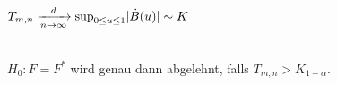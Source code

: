 \documentclass{cheat-sheet}
\newcommand{\E}{\mathbb{E}} %
\newcommand{\ind}{\mathbbm{1}} %
\DeclareMathOperator{\var}{Var} %
\newcommand{\Normal}{\mathcal{N}} %
\begin{document}
\iffalse
\begin{bem}
  Asymptotik von $T_{n,m}$ für $m, n \to \infty$
  \[
    X_{m,n}(u) \coloneqq \sqrt{\tfrac{m \cdot n}{m + n}} \left( \hat{G}_n(u) - \hat{G}^*_m(u) \right), \quad
    0 \leq u \leq 1.
  \]
  \[
    \E X_{m,n} = \sqrt{\tfrac{m \cdot n}{m + n}} \left( \E \ind_{\cinterval{0}{u}}(U_1) - \E \ind_{\cinterval{0}{u}}(U^*_1) \right) = 0
  \]
  \[
    \var(X_{m,n}) = \tfrac{m \cdot n}{m + n} \left( \E (\hat{G}_n(u))^2 + \E (\hat{G}_m(u))^2 - 2 \E \hat{G}^*_n(u) \cdot \E \hat{G}^*_m(u) \right)
  \]

  Genauso wie oben ergibt sich
  \[
    (X_{m,n}(u_1), \ldots, X_{m,n}(u_k)) \xra[n \to \infty]{d} \Normal_k(0, \Sigma)
    \quad \text{mit} \quad
    \Sigma_{ij} = u_i \wedge u_j - u_i \cdot u_j.
  \]

  Daraus folgt die schwache Konvergenz
  \[ X_{m,n}(\blank) \xra[n \to \infty]{d} \dot{B}(\blank) \]
  im Skorodoch-Raum $\mathcal{D} \cinterval{0}{1}$.
\end{bem}
\fi

\begin{lem}
  $T_{m,n} \xrightarrow[n \to \infty]{d} \sup_{0 \leq u \leq 1} \lvert\dot{B}(u)\rvert \sim K$
\end{lem}

\begin{entscheidungsregel} \mbox{}\\
  $H_0 : F = F^*$ wird genau dann abgelehnt, falls $T_{m,n} > K_{1-\alpha}$.
\end{entscheidungsregel}


\end{document}
